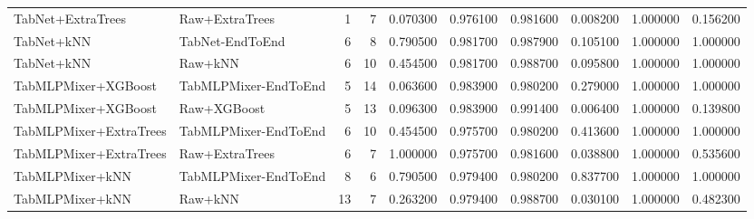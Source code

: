 \begin{table}
\begin{tabular}{llrrrrrrrr}
TabNet+ExtraTrees & Raw+ExtraTrees & 1 & 7 & 0.070300 & 0.976100 & 0.981600 & 0.008200 & 1.000000 & 0.156200 \\
TabNet+kNN & TabNet-EndToEnd & 6 & 8 & 0.790500 & 0.981700 & 0.987900 & 0.105100 & 1.000000 & 1.000000 \\
TabNet+kNN & Raw+kNN & 6 & 10 & 0.454500 & 0.981700 & 0.988700 & 0.095800 & 1.000000 & 1.000000 \\
TabMLPMixer+XGBoost & TabMLPMixer-EndToEnd & 5 & 14 & 0.063600 & 0.983900 & 0.980200 & 0.279000 & 1.000000 & 1.000000 \\
TabMLPMixer+XGBoost & Raw+XGBoost & 5 & 13 & 0.096300 & 0.983900 & 0.991400 & 0.006400 & 1.000000 & 0.139800 \\
TabMLPMixer+ExtraTrees & TabMLPMixer-EndToEnd & 6 & 10 & 0.454500 & 0.975700 & 0.980200 & 0.413600 & 1.000000 & 1.000000 \\
TabMLPMixer+ExtraTrees & Raw+ExtraTrees & 6 & 7 & 1.000000 & 0.975700 & 0.981600 & 0.038800 & 1.000000 & 0.535600 \\
TabMLPMixer+kNN & TabMLPMixer-EndToEnd & 8 & 6 & 0.790500 & 0.979400 & 0.980200 & 0.837700 & 1.000000 & 1.000000 \\
TabMLPMixer+kNN & Raw+kNN & 13 & 7 & 0.263200 & 0.979400 & 0.988700 & 0.030100 & 1.000000 & 0.482300 \\
\bottomrule
\end{tabular}
\end{table}
